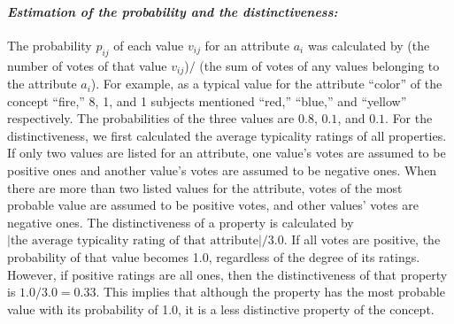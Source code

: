 \paragraph{\it Estimation of the probability and the distinctiveness:}
The probability $p_{ij}$ of each value $v_{ij}$ for an attribute $a_i$
was calculated by (the number of votes of that value $v_{ij}$)$/$
(the sum of votes of any values belonging to the attribute $a_i$).
For example, as a typical value for the attribute ``color'' 
of the concept ``fire,'' 8, 1, and 1 subjects mentioned ``red,''
``blue,'' and ``yellow'' respectively.  The probabilities of the three
values are $0.8$, $0.1$, and $0.1$.
For the distinctiveness, we first calculated the average typicality ratings of all properties.
If only two values are listed for an attribute, one value's votes are 
assumed to be positive ones and another value's votes are assumed to be
negative ones.  When there are more than two listed values for the attribute, 
votes of the most probable value are assumed to be positive votes, 
and other values' votes are negative ones.  
The distinctiveness of a property is calculated by 
$\left|\mbox{the average typicality rating of that attribute}\right|/3.0$.
If all votes are positive, the probability of that value becomes 1.0, 
regardless of the degree of its ratings. 
However, if positive ratings are all ones, then the distinctiveness of 
that property is $1.0/3.0=0.33$.
This implies that although the property has the most probable value with its probability of 1.0, 
it is a less distinctive property of the concept.

